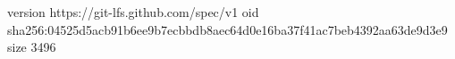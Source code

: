 version https://git-lfs.github.com/spec/v1
oid sha256:04525d5acb91b6ee9b7ecbbdb8aec64d0e16ba37f41ac7beb4392aa63de9d3e9
size 3496
